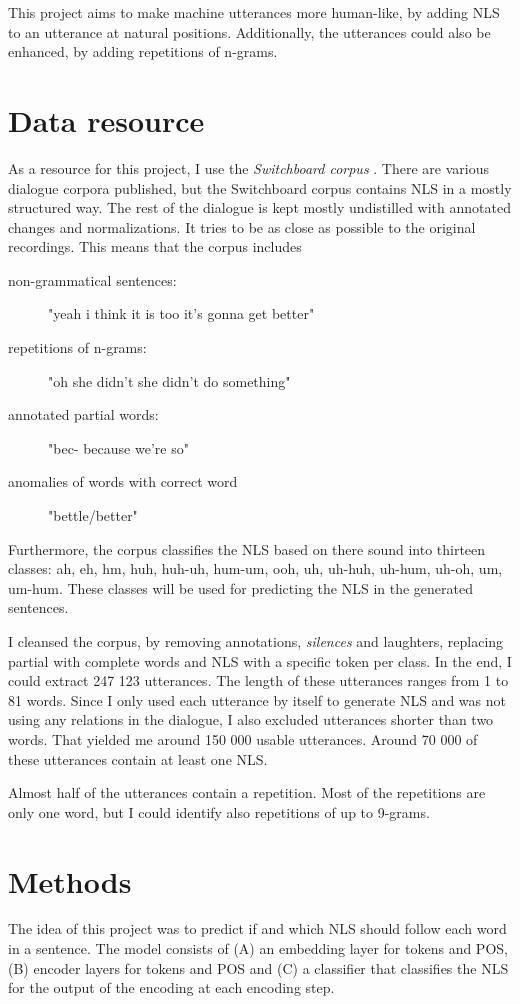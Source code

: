 \documentclass[
	11pt, %
]{fphw}
\begin{document}
This project aims to make machine utterances more human-like, by adding NLS to an utterance at natural positions. Additionally, the utterances could also be enhanced, by adding repetitions of n-grams.

\section*{Data resource}
As a resource for this project, I use the \emph{Switchboard corpus} \cite{switchboard}. There are various dialogue corpora published, but the Switchboard corpus contains NLS in a mostly structured way. The rest of the dialogue is kept mostly undistilled with annotated changes and normalizations. It tries to be as close as possible to the original recordings. This means that the corpus includes
\begin{description}
    \item[non-grammatical sentences:] "yeah i think it is too it's gonna get better"
    \item[repetitions of n-grams:] "oh she didn't she didn't do something"
    \item[annotated partial words:] "bec- because we're so"
    \item[anomalies of words with correct word] "bettle/better"
\end{description}

Furthermore, the corpus classifies the NLS based on there sound into thirteen classes: ah, eh, hm, huh, huh-uh, hum-um, ooh, uh, uh-huh, uh-hum, uh-oh, um, um-hum. These classes will be used for predicting the NLS in the generated sentences.

I cleansed the corpus, by removing annotations, \emph{silences} and laughters, replacing partial with complete words and NLS with a specific token per class. In the end, I could extract 247 123 utterances. The length of these utterances ranges from 1 to 81 words. Since I only used each utterance by itself to generate NLS and was not using any relations in the dialogue, I also excluded utterances shorter than two words. That yielded me around 150 000 usable utterances. Around 70 000 of these utterances contain at least one NLS.

Almost half of the utterances contain a repetition. Most of the repetitions are only one word, but I could identify also repetitions of up to 9-grams.

\section*{Methods}
The idea of this project was to predict if and which NLS should follow each word in a sentence. The model consists of (A) an embedding layer for tokens and POS, (B) encoder layers for tokens and POS and (C) a classifier that classifies the NLS for the output of the encoding at each encoding step.
\end{document}
